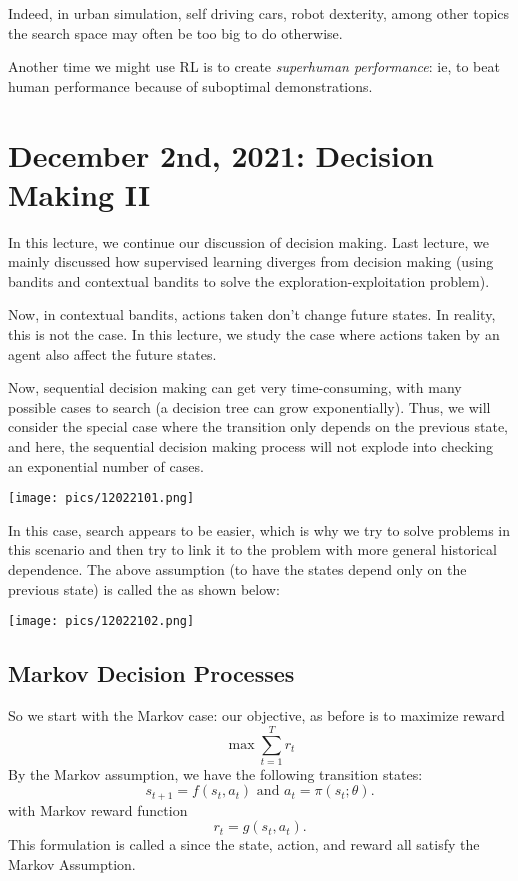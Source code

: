 \documentclass[11pt]{scrartcl}
\begin{document}
Indeed, in urban simulation, self driving cars, robot dexterity, among other topics the search space may often be too big to do otherwise. 

Another time we might use RL is to create \textit{superhuman performance}: ie, to beat human performance because of suboptimal demonstrations. 

\newpage

\section{December 2nd, 2021: Decision Making II}

In this lecture, we continue our discussion of decision making. Last lecture, we mainly discussed how supervised learning diverges from decision making (using bandits and contextual bandits to solve the exploration-exploitation problem).

Now, in contextual bandits, actions taken don't change future states. In reality, this is not the case. In this lecture, we study the case where actions taken by an agent also affect the future states. 

Now, sequential decision making can get very time-consuming, with many possible cases to search (a decision tree can grow exponentially). Thus, we will consider the special case where the transition only depends on the previous state, and here, the sequential decision making process will not explode into checking an exponential number of cases.
\begin{center}
    \texttt{[image: pics/12022101.png]}
\end{center}
In this case, search appears to be easier, which is why we try to solve problems in this scenario and then try to link it to the problem with more general historical dependence.
The above assumption (to have the states depend only on the previous state) is called the  as shown below:
\begin{center}
    \texttt{[image: pics/12022102.png]}
\end{center}

\subsection{Markov Decision Processes}

So we start with the Markov case: our objective, as before is to maximize reward
$$\max\sum_{t=1}^{T}r_t$$
By the Markov assumption, we have the following transition states:
\begin{equation*}
    s_{t+1} = f(s_t, a_t) \text{ and } a_t = \pi(s_t;\theta).
\end{equation*}
with Markov reward function
\begin{equation*}
    r_t = g(s_t,a_t).
\end{equation*}
This formulation is called a  since the state, action, and reward all satisfy the Markov Assumption. 
\end{document}
